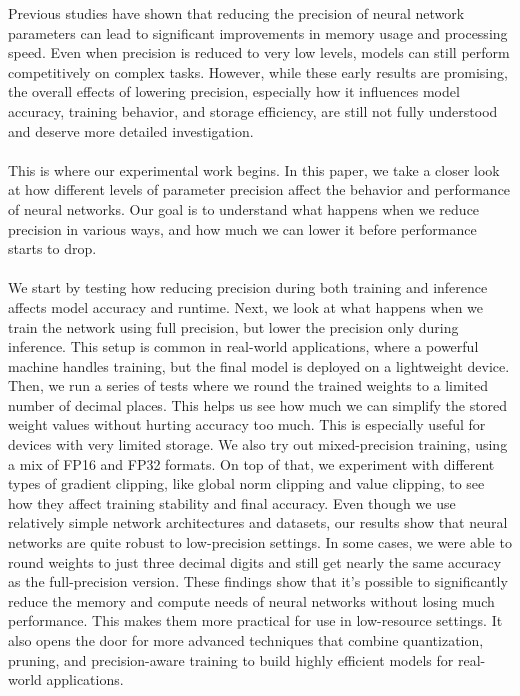 \documentclass[11pt]{article}
\begin{document}
	Previous studies have shown that reducing the precision of neural network parameters can lead to significant improvements in memory usage and processing speed. Even when precision is reduced to very low levels, models can still perform competitively on complex tasks. However, while these early results are promising, the overall effects of lowering precision, especially how it influences model accuracy, training behavior, and storage efficiency, are still not fully understood and deserve more detailed investigation. \\ \\
	This is where our experimental work begins. 
	In this paper, we take a closer look at how different levels of parameter precision affect the behavior and performance of neural networks. Our goal is to understand what happens when we reduce precision in various ways, and how much we can lower it before performance starts to drop. \\ \\
	We start by testing how reducing precision during both training and inference affects model accuracy and runtime. Next, we look at what happens when we train the network using full precision, but lower the precision only during inference. This setup is common in real-world applications, where a powerful machine handles training, but the final model is deployed on a lightweight device. 
	Then, we run a series of tests where we round the trained weights to a limited number of decimal places. This helps us see how much we can simplify the stored weight values without hurting accuracy too much. This is especially useful for devices with very limited storage. 
	We also try out mixed-precision training, using a mix of FP16 and FP32 formats. On top of that, we experiment with different types of gradient clipping, like global norm clipping and value clipping, to see how they affect training stability and final accuracy. 
	Even though we use relatively simple network architectures and datasets, our results show that neural networks are quite robust to low-precision settings. In some cases, we were able to round weights to just three decimal digits and still get nearly the same accuracy as the full-precision version. 
	These findings show that it’s possible to significantly reduce the memory and compute needs of neural networks without losing much performance. This makes them more practical for use in low-resource settings. It also opens the door for more advanced techniques that combine quantization, pruning, and precision-aware training to build highly efficient models for real-world applications. 
	
\end{document}
